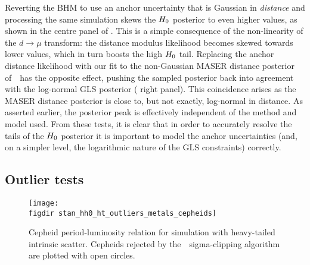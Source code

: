 \documentclass[a4paper,fleqn,usenatbib]{mnras}
\newcommand{\riess}{\citetalias{Riess_etal:2016}}
\begin{document}
{Reverting the BHM to use an anchor uncertainty that is Gaussian in {\em distance} and processing the same simulation skews the $H_0$ posterior to even higher values, as shown in the centre panel of . This is a simple consequence of the non-linearity of the $d \rightarrow \mu$ transform: the distance modulus likelihood becomes skewed towards lower values, which in turn boosts the high $H_0$ tail. Replacing the anchor distance likelihood with our fit to the non-Gaussian MASER distance posterior of~\riess\ has the opposite effect, pushing the sampled posterior back into agreement with the log-normal GLS posterior ( right panel). This coincidence arises as the MASER distance posterior is close to, but not exactly, log-normal in distance. As asserted earlier, the posterior peak is effectively independent of the method and model used. From these tests, it is clear that in order to accurately resolve the tails of the $H_0$ posterior it is important to model the anchor uncertainties (and, on a simpler level, the logarithmic nature of the GLS constraints) correctly.


\subsection{Outlier tests}
\label{section:outlier_sim}

\begin{figure}
\texttt{[image: \\figdir stan\_hh0\_ht\_outliers\_metals\_cepheids]}
\caption{Cepheid period-luminosity relation for simulation with heavy-tailed intrinsic scatter. Cepheids rejected by the~\protect\riess\ sigma-clipping algorithm are plotted with open circles.}
\label{figure:ht_ceph_sim}
\end{figure}

}
\end{document}
